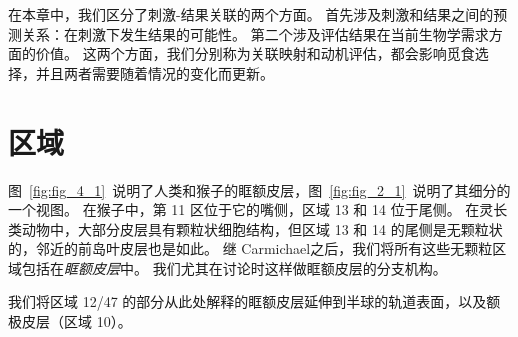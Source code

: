 在本章中，我们区分了刺激-结果关联的两个方面。
首先涉及刺激和结果之间的预测关系：在刺激下发生结果的可能性。
第二个涉及评估结果在当前生物学需求方面的价值。
这两个方面，我们分别称为关联映射和动机评估，都会影响觅食选择，并且两者需要随着情况的变化而更新。\par



\section{区域}

图~\ref{fig:fig_4_1}~说明了人类和猴子的眶额皮层，图~\ref{fig:fig_2_1}~说明了其细分的一个视图。
在猴子中，第 11 区位于它的嘴侧，区域 13 和 14 位于尾侧\cite{walker1940cytoarchitectural}。
在灵长类动物中，大部分皮层具有颗粒状细胞结构，但区域 13 和 14 的尾侧是无颗粒状的，邻近的前岛叶皮层也是如此。
继 Carmichael\cite{carmichael1994architectonic}之后，我们将所有这些无颗粒区域包括在\textit{眶额皮层}中。
我们尤其在讨论时这样做眶额皮层的分支机构。\par


我们将区域 12/47 的部分从此处解释的眶额皮层延伸到半球的轨道表面，以及额极皮层（区域 10）。


